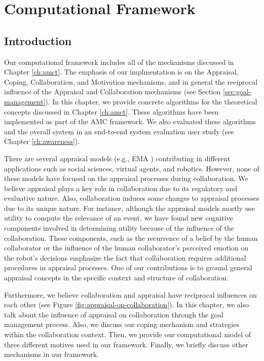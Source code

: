 \documentclass[12pt]{report}
\begin{document}
\chapter{Computational Framework}
\label{ch:appraisals}

\vspace*{-2mm}
\section{Introduction}
\vspace*{-3mm}
Our computational framework includes all of the mechanisms discussed in
Chapter \ref{ch:amct}. The emphasis of our implmentation is on the Appraisal,
Coping, Collaboration, and Motivation mechanisms, and in general the reciprocal
influence of the Appraisal and Collaboration mechanisms (see Section
\ref{sec:goal-management}). In this chapter, we provide concrete algorithms for
the theoretical concepts discussed in Chapter \ref{ch:amct}. These algorithms
have been implemented as part of the AMC framework. We also evaluated these
algorithms and the overall system in an end-to-end system evaluation user study
(see Chapter \ref{ch:awareness}).

There are several appraisal models (e.g., EMA \cite{marsella:ema-process-model})
contributing in different applications such as social sciences, virtual agents,
and robotics. However, none of these models have focused on the appraisal
processes during collaboration. We believe appraisal plays a key role in
collaboration due to its regulatory and evaluative nature. Also, collaboration
induces some changes to appraisal processes due to its unique nature. For
instance, although the appraisal models mostly use utility to compute the
relevance of an event, we have found new cognitive components involved in
determining utility because of the influence of the collaboration. These
components, such as the recurrence of a belief by the human collaborator or the
influence of the human collaborator's perceived emotion on the robot's decisions
emphasize the fact that collaboration requires additional procedures in
appraisal processes. One of our contributions is to ground general appraisal
concepts in the specific context and structure of collaboration.

Furthermore, we believe collaboration and appraisal have reciprocal influences
on each other (see Figure \ref{fig:appraisal-on-collaboration}). In this
chapter, we also talk about the influence of appraisal on collaboration through
the goal management process. Also, we discuss our coping mechanism and
strategies within the collaboration context. Then, we provide our computational
model of three different motives used in our framework. Finally, we briefly
discuss other mechanisms in our framework.
\end{document}

